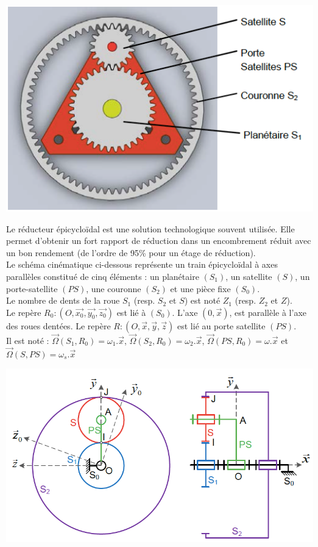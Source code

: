 \begin{center}
    \includegraphics[scale=0.4]{png/2_exo7.png}
\end{center}

Le réducteur épicycloïdal est une solution technologique souvent utilisée. Elle permet d’obtenir un fort rapport de réduction dans un encombrement réduit avec un bon rendement (de l’ordre de 95\% pour un étage de réduction).\\
Le schéma cinématique ci-dessous représente un train épicycloïdal à axes parallèles constitué de cinq éléments : un planétaire $(S_1)$, un satellite $(S)$, un porte-satellite $(PS)$, une couronne $(S_2)$ et une pièce fixe $(S_0)$.\\
Le nombre de dents de la roue $S_1$ (resp. $S_2$ et $S$) est noté $Z_1$ (resp. $Z_2$ et $Z$).\\
Le repère $R_0 : (O,\overrightarrow{x_0},\overrightarrow{y_0},\overrightarrow{z_0})$ est lié à $(S_0)$. L'axe $(0,\overrightarrow{x})$, est parallèle à l'axe des roues dentées. Le repère $R : (O,\overrightarrow{x},\overrightarrow{y},\overrightarrow{z})$ est lié au porte satellite $(PS)$.\\
Il est noté : $\overrightarrow{\Omega}(S_1,R_0)=\omega_1.\overrightarrow{x}$, $\overrightarrow{\Omega}(S_2,R_0)=\omega_2.\overrightarrow{x}$, $\overrightarrow{\Omega}(PS,R_0)=\omega.\overrightarrow{x}$ et $\overrightarrow{\Omega}(S,PS)=\omega_s.\overrightarrow{x}$

\begin{center}
    \includegraphics[scale=0.35]{png/1_exo7.png}
\end{center}

